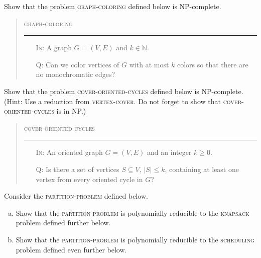 \documentclass[a4paper,12pt]{amsart}
\begin{document}
        
        \medskip\begin{problem}
        Show that the problem \textsc{graph-coloring} defined below is NP-complete.
        
        \bigskip
        \begin{quote}
        \begin{mdframed}
        \textsc{graph-coloring}
        \medskip\hrule\medskip
        \begin{itemize}
            \item[\textsc{In:}] A graph $G=(V,E)$ and $k\in\mathbb N$.
            \item[\textsc{Q:}] Can we color vertices of $G$ with at most $k$ colors so that there are no monochromatic edges?
        \end{itemize}
        \end{mdframed}
        \end{quote}
        
        \end{problem}
        
        
        Show that the problem \textsc{cover-oriented-cycles} defined below is NP-complete. (Hint: Use a reduction from \textsc{vertex-cover}. Do not forget to show that \textsc{cover-oriented-cycles} is in NP.)
        
        \bigskip
        \begin{quote}
        \begin{mdframed}
        \textsc{cover-oriented-cycles}
        \medskip\hrule\medskip
        \begin{itemize}
            \item[\textsc{In:}] An oriented graph $G=(V,E)$ and an integer $k\geq 0$.
            \item[\textsc{Q:}] Is there a set of vertices $S\subseteq V$, $|S|\leq k$, containing at least one vertex from every oriented cycle in $G$?
        \end{itemize}
        \end{mdframed}
        \end{quote}
        

        
        \bigskip

        Consider the \textsc{partition-problem} defined below.
        \begin{enumerate}[(a)]
            \item Show that the \textsc{partition-problem} is polynomially reducible to the \textsc{knapsack} problem defined further below.
            \item Show that the \textsc{partition-problem} is polynomially reducible to the \textsc{scheduling} problem defined even further below.
        \end{enumerate}
        
\end{document}
